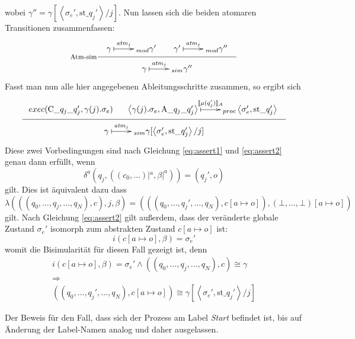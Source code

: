 wobei $\gamma'' = \gamma[\left<\sigma_e',\textrm{st\_}q_j'\right>/j]$.
Nun lassen sich die beiden atomaren Transitionen zusammenfassen:
\[
\inference[Atm-sim]{
  \xymatrix{ \gamma \ar@{|->}[r]^-{\mathit{atm}_j} & _{mod}
    \gamma'
  } &
  \xymatrix{ \gamma'\ar@{|->}[r]^-{\mathit{atm}_j} & _{mod}
    \gamma''
  }
}{
  \xymatrix{ \gamma \ar@{|->}[r]^-{\mathit{atm}_j} & _{sim}
    \gamma''
  }
}
\]
Fasst man nun alle hier angegebenen Ableitungsschritte zusammen, so ergibt sich
\[
\inference{
  exec(\textrm{C\_}q_j\textrm{\_}q_j',\gamma(j).\sigma_e) &
  \xymatrix{ \left<\gamma(j).\sigma_e,\textrm{A\_}q_j\textrm{\_}q_j'\right> \ar@{|->}[r]^-{\llbracket \mu(q_j')\rrbracket_A} & _{proc}
    \left<\sigma_e',\textrm{st\_}q_j'\right> }
}{
  \xymatrix{ \gamma \ar@{|->}[r]^-{\mathit{atm}_j} & _{sim}
    \gamma[\left<\sigma_e',\textrm{st\_}q_j'\right>/j]
  }
}
\]
Diese zwei Vorbedingungen sind nach Gleichung \ref{eq:assert1} und \ref{eq:assert2} genau dann erfüllt, wenn
\[ \delta^a(q_j,((c_0,\dots)|^a,\beta|^a)) = (q_j',o) \]
gilt.
Dies ist äquivalent dazu dass
\[ \lambda(((q_0,\dots,q_j,\dots,q_N),c),j,\beta) = (((q_0,\dots,q_j',\dots,q_N),c[a\mapsto o]),(\bot,\dots,\bot)[a\mapsto o]) \]
gilt.
Nach Gleichung \ref{eq:assert2} gilt außerdem, dass der veränderte globale Zustand $\sigma_e'$ isomorph zum abstrakten Zustand $c[a\mapsto o]$ ist:
\[ i(c[a\mapsto o],\beta) = \sigma_e' \]
womit die Bisimularität für diesen Fall gezeigt ist, denn
\[
\begin{array}{c}
  i(c[a\mapsto o],\beta) = \sigma_e' \land ((q_0,\dots,q_j,\dots,q_N),c)\cong\gamma\\
  \Rightarrow\\
  ((q_0,\dots,q_j',\dots,q_N),c[a\mapsto o])\cong \gamma[\left<\sigma_e',\textrm{st\_}q_j'\right>/j]
\end{array}
\]

Der Beweis für den Fall, dass sich der Prozess am Label \emph{Start} befindet ist, bis auf Änderung der Label-Namen analog und daher ausgelassen.
